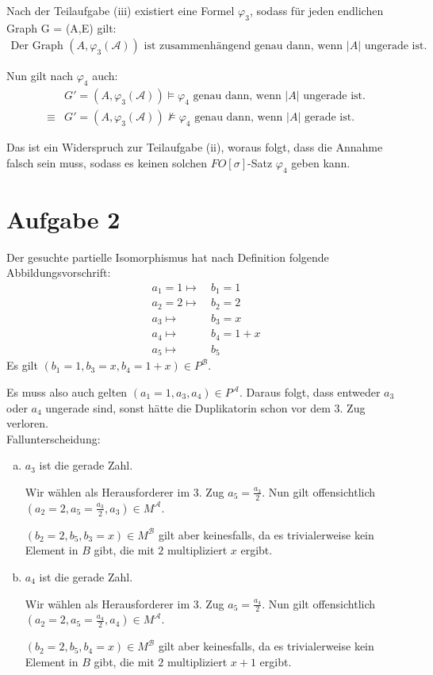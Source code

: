 \documentclass[a4paper,10pt]{article}
\begin{document}
\begin{enumerate}[(i)]
			Nach der Teilaufgabe (iii) existiert eine Formel $\varphi_3$, sodass für jeden 				endlichen Graph G = (A,E) gilt:
			\begin{align*}
				\text{Der Graph } (A, \varphi_3(\mathcal{A})) \text{ ist zusammenhängend genau dann, wenn $|A|$ ungerade ist.}
			\end{align*}
			
			Nun gilt nach $\varphi_4$ auch:
			\begin{align*}
				&G' = (A,\varphi_3(\mathcal{A})) \vDash \varphi_4 \text{ genau dann, wenn $|A|$ ungerade ist.} \\
				\equiv%
				&G' = (A,\varphi_3(\mathcal{A})) \nvDash \varphi_4 \text{ genau dann, wenn $|A|$ gerade ist.} 
			\end{align*}
			
			Das ist ein Widerspruch zur Teilaufgabe (ii), woraus folgt, dass die Annahme falsch sein muss, sodass es keinen solchen 							$FO[\sigma]$-Satz $\varphi_4$ geben kann.
	\end{enumerate}
\section*{Aufgabe 2}
Der gesuchte partielle Isomorphismus hat nach Definition folgende Abbildungsvorschrift:
\begin{align*}
a_1 = 1 \mapsto & ~ b_1 = 1 \\
a_2 = 2 \mapsto &  ~ b_2 = 2 \\
a_3 \mapsto & ~ b_3 = x \\
a_4 \mapsto & ~ b_4 = 1 + x \\
a_5 \mapsto & ~ b_5
\end{align*}
Es gilt $\left(b_1 = 1,b_3 = x,b_4 = 1+x\right) \in P^{\mathcal B}$.

Es muss also auch gelten $\left(a_1 = 1,a_3,a_4\right) \in P^{\mathcal A}$. Daraus folgt, dass entweder $a_3$ oder $a_4$ ungerade sind, sonst hätte die Duplikatorin schon vor dem 3. Zug verloren.\\

Fallunterscheidung:
\begin{enumerate}[(a)]
\item $a_3$ ist die gerade Zahl.

Wir wählen als Herausforderer im 3. Zug $a_5 = \frac{a_3}{2}$.
Nun gilt offensichtlich $\left(a_2 = 2,a_5 = \frac{a_3}{2},a_3\right) \in M^{\mathcal A}$.

$\left(b_2 = 2,b_5,b_3 = x\right) \in M^{\mathcal B}$ gilt aber keinesfalls, da es trivialerweise kein Element in $B$ gibt, die mit $2$ multipliziert $x$ ergibt.
\item $a_4$ ist die gerade Zahl.

Wir wählen als Herausforderer im 3. Zug $a_5 = \frac{a_4}{2}$.
Nun gilt offensichtlich $\left(a_2 = 2,a_5 = \frac{a_4}{2},a_4\right) \in M^{\mathcal A}$.

$\left(b_2 = 2,b_5,b_4 = x\right) \in M^{\mathcal B}$ gilt aber keinesfalls, da es trivialerweise kein Element in $B$ gibt, die mit $2$ multipliziert $x + 1$ ergibt.
\end{enumerate}
\end{document}
